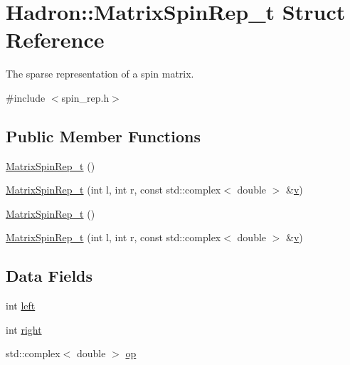 \hypertarget{structHadron_1_1MatrixSpinRep__t}{}\section{Hadron\+:\+:Matrix\+Spin\+Rep\+\_\+t Struct Reference}
\label{structHadron_1_1MatrixSpinRep__t}


The sparse representation of a spin matrix.  




{\ttfamily \#include $<$spin\+\_\+rep.\+h$>$}

\subsection*{Public Member Functions}
\begin{DoxyCompactItemize}
\item 
\mbox{\hyperlink{structHadron_1_1MatrixSpinRep__t_a38258a85d8bc13c1f94ef0958795a49e}{Matrix\+Spin\+Rep\+\_\+t}} ()
\item 
\mbox{\hyperlink{structHadron_1_1MatrixSpinRep__t_a3a057c50dbc88ead180122518485973c}{Matrix\+Spin\+Rep\+\_\+t}} (int l, int r, const std\+::complex$<$ double $>$ \&\mbox{\hyperlink{hadron__timeslice_8cc_a716fc87f5e814be3ceee2405ed6ff22a}{v}})
\item 
\mbox{\hyperlink{structHadron_1_1MatrixSpinRep__t_a38258a85d8bc13c1f94ef0958795a49e}{Matrix\+Spin\+Rep\+\_\+t}} ()
\item 
\mbox{\hyperlink{structHadron_1_1MatrixSpinRep__t_a3a057c50dbc88ead180122518485973c}{Matrix\+Spin\+Rep\+\_\+t}} (int l, int r, const std\+::complex$<$ double $>$ \&\mbox{\hyperlink{hadron__timeslice_8cc_a716fc87f5e814be3ceee2405ed6ff22a}{v}})
\end{DoxyCompactItemize}
\subsection*{Data Fields}
\begin{DoxyCompactItemize}
\item 
int \mbox{\hyperlink{structHadron_1_1MatrixSpinRep__t_ab2c703ae13c904d3f0401fed64b05f83}{left}}
\item 
int \mbox{\hyperlink{structHadron_1_1MatrixSpinRep__t_a8c99524ce50d315e915216514946d5ec}{right}}
\item 
std\+::complex$<$ double $>$ \mbox{\hyperlink{structHadron_1_1MatrixSpinRep__t_aebc25f04c53c0422ab31366020649dad}{op}}
\end{DoxyCompactItemize}


